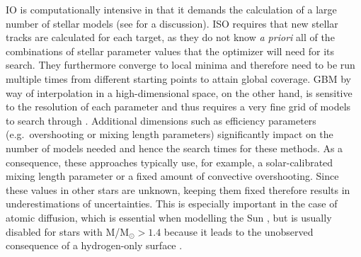 \documentclass[manuscript,linenumbers]{aastex6}
\begin{document}
IO is computationally intensive in that it demands the calculation of a large number of stellar models (see \citealt{2009ApJ...699..373M} for a discussion).
ISO requires that new stellar tracks are calculated for each target, as they do not know \emph{a priori} all of the combinations of stellar parameter values that the optimizer will need for its search. They furthermore converge to local minima and therefore need to be run multiple times from different starting points to attain global coverage. %
GBM by way of interpolation in a high-dimensional space, on the other hand, is sensitive to the resolution of each parameter and thus requires a very fine grid of models to search through \citep[see e.g.][who use more than five million models that were varied in just four initial parameters]{2010ApJ...725.2176Q}. Additional dimensions such as efficiency parameters (e.g.\ overshooting or mixing length parameters) significantly impact on the number of models needed and hence the search times for these methods. As a consequence, these approaches typically use, for example, a solar-calibrated mixing length parameter or a fixed amount of convective overshooting. Since these values in other stars are unknown, keeping them fixed therefore results in underestimations of uncertainties. This is especially important in the case of atomic diffusion, which is essential when modelling the Sun \citep[see e.g.][]{1994MNRAS.269.1137B}, but is usually disabled for stars with M/M$_\odot > 1.4$ because it leads to the unobserved consequence of a hydrogen-only surface \citep{2002AA...390..611M}. 
\end{document}
